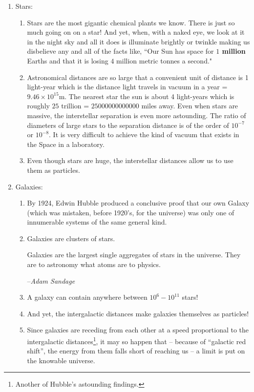 \documentclass[12pt,a4paper]{book}
\begin{document}
\begin{enumerate}
\begin{enumerate}
        \end{enumerate}
    \item Stars:
        \begin{enumerate}
            \item Stars are the most gigantic chemical plants we know. There is just so much going on on a star! And yet, when, with a naked eye, we look at it in the night sky and all it does is illuminate brightly or twinkle making us disbelieve any and all of the facts like, ``Our Sun has space for \textbf{$1$ million} Earths and that it is losing $4$ million metric tonnes a second."
            \item Astronomical distances are so large that a convenient unit of distance is 1 light-year which is the distance light travels in vacuum in a year = $9.46\times10^{15}\si{\m}$. The nearest star the sun is about 4 light-years which is roughly $25$ trillion = $25000000000000$ miles away. Even when stars are massive, the interstellar separation is even more astounding. The ratio of diameters of large stars to the separation distance is of the order of $10^{-7}$ or $10^{-8}$.  It is very difficult to achieve the kind of vacuum that exists in the Space in a laboratory. 
            \item Even though stars are huge, the interstellar distances allow us to use them as particles.
        \end{enumerate}
    \item Galaxies:
        \begin{enumerate}
            \item By 1924, Edwin Hubble produced a conclusive proof that our own Galaxy (which was mistaken, before 1920's, for the universe) was only one of innumerable systems of the same general kind. 
            \item Galaxies are clusters of stars.
                \epigraph
                {
                    Galaxies are the largest single aggregates of stars in the universe. They are to astronomy what atoms are to physics. 
                }
                {
                    --\textit{Adam Sandage}
                }
            \item A galaxy can contain anywhere between $10^{6}-10^{11}$ stars!
            \item And yet, the intergalactic distances make galaxies themselves as particles!
            \item Since galaxies are receding from each other at a speed proportional to the intergalactic distances\footnote{Another of Hubble's astounding findings.}, it may so happen that -- because of ``galactic red shift'', the energy from them falls short of reaching us -- a limit is put on the knowable universe.

\end{enumerate}
\end{enumerate}
\end{document}
